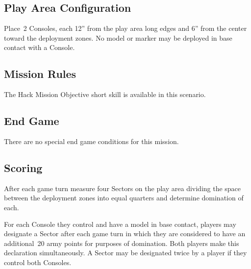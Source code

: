\label{mission:sweepandclear}

\subsection{Play Area Configuration}

Place~2 Consoles, each 12'' from the play area long edges and 6'' from
the center toward the deployment zones.  No model or marker may be
deployed in base contact with a Console.

\subsection{Mission Rules}

The Hack Mission Objective short skill is available in this scenario.

\subsection{End Game}

There are no special end game conditions for this mission.

\subsection{Scoring}


  After each game turn measure four
Sectors on the play area dividing the space between the deployment
zones into equal quarters and determine domination of each.

  For each Console they control and
have a model in base contact, players may designate a Sector after
each game turn in which they are considered to have an additional~20
army points for purposes of domination.  Both players make this
declaration simultaneously.  A Sector may be designated twice by a
player if they control both Consoles.

